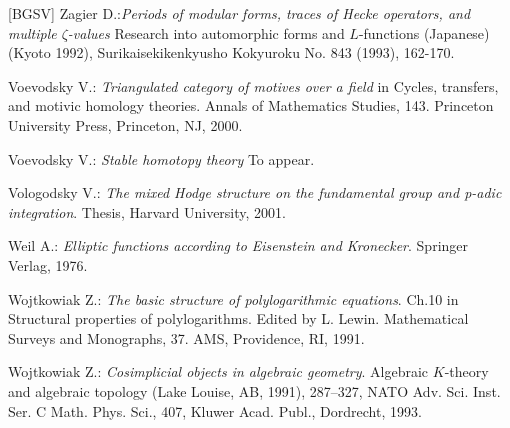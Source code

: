 \documentclass[10pt]{article}
\begin{document}
\begin{thebibliography}{[BGSV]}
 Zagier D.:{\it Periods of modular forms, traces of Hecke operators, and multiple $\zeta$-values} Research into automorphic 
forms and $L$-functions (Japanese) (Kyoto 1992), Surikaisekikenkyusho Kokyuroku No. 843 (1993), 162-170.

 Voevodsky V.:  {\it Triangulated category of motives over a field} in 
Cycles, transfers, and motivic homology theories. Annals of Mathematics Studies,
143. Princeton University Press, Princeton, NJ, 2000. 

 Voevodsky V.:  {\it Stable homotopy theory} To appear.

 Vologodsky V.:  
{\it The mixed Hodge structure on the fundamental group and 
p-adic integration}. Thesis, Harvard University, 2001.

 Weil A.: {\it Elliptic functions according to Eisenstein and Kronecker}. Springer Verlag, 1976. 

 Wojtkowiak Z.: 
{\it The basic structure of polylogarithmic equations}. Ch.10 in 
Structural properties of polylogarithms. 
Edited by L. Lewin. Mathematical Surveys and Monographs, 37. 
AMS, Providence, RI, 1991.

 Wojtkowiak Z.: {\it Cosimplicial objects in algebraic geometry}. 
Algebraic $K$-theory and algebraic topology (Lake Louise, AB, 1991),
287--327, NATO Adv. Sci. Inst. Ser. C Math. Phys. Sci., 407, 
Kluwer Acad. Publ., 
Dordrecht, 1993. 

\end{thebibliography}
\end{document}
